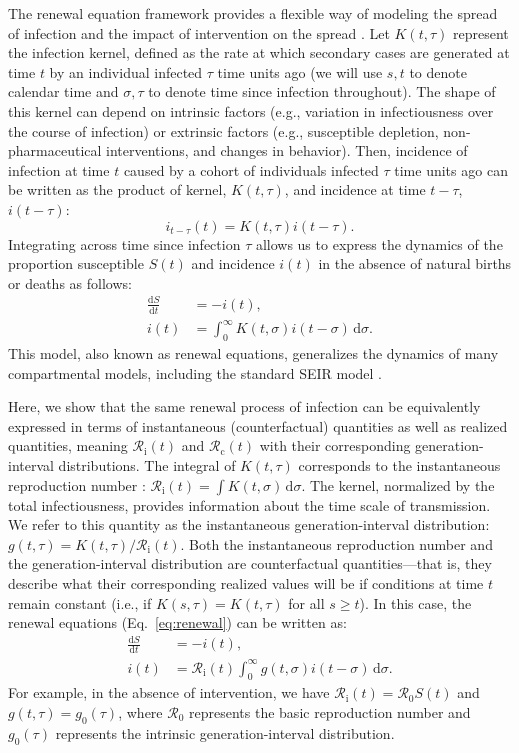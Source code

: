 \documentclass[12pt]{article}
\newcommand{\eref}[1]{Eq.~\ref{eq:#1}}
\newcommand{\Rx}[1]{\ensuremath{{\mathcal R}_{#1}}\xspace}
\newcommand{\Ro}{\Rx{0}}
\newcommand{\Rc}{\Rx{\mathrm{c}}}
\newcommand{\Ri}{\Rx{\mathrm{i}}}
\newcommand{\dd}[1]{\ensuremath{\, \mathrm{d}#1}}
\newcommand{\dsigma}{\dd{\sigma}}
\begin{document}
The renewal equation framework provides a flexible way of modeling the spread of infection and the impact of intervention on the spread \citep{fraser2007estimating}.
Let $K(t, \tau)$ represent the infection kernel, defined as the rate at which secondary cases are generated at time $t$ by an individual infected $\tau$ time units ago (we will use $s, t$ to denote calendar time and $\sigma, \tau$ to denote time since infection throughout).
The shape of this kernel can depend on intrinsic factors (e.g., variation in infectiousness over the course of infection) or extrinsic factors (e.g., susceptible depletion, non-pharmaceutical interventions, and changes in behavior).
Then, incidence of infection at time $t$ caused by a cohort of individuals infected $\tau$ time units ago can be written as the product of kernel, $K(t, \tau)$, and incidence at time $t-\tau$, $i(t-\tau)$:
\begin{equation}
i_{t-\tau}(t) = K(t, \tau) i(t-\tau).
\end{equation}
Integrating across time since infection $\tau$ allows us to express the dynamics of the proportion susceptible $S(t)$ and incidence $i(t)$ in the absence of natural births or deaths as follows: 
\begin{align}
\frac{\mathrm{d}S}{\mathrm{d}t} &= - i(t),\\
i(t) &= \int_0^\infty K(t, \sigma) i(t-\sigma) \dsigma.
\label{eq:renewal}
\end{align}
This model, also known as renewal equations, generalizes the dynamics of many compartmental models, including the standard SEIR model \citep{heesterbeek1996concept, diekmann2000mathematical, roberts2004modelling, aldis2005integral, roberts2007model, champredon2018equivalence}.

Here, we show that the same renewal process of infection can be equivalently expressed in terms of instantaneous (counterfactual) quantities as well as realized quantities, meaning $\Ri(t)$ and $\Rc(t)$ with their corresponding generation-interval distributions.
The integral of $K(t, \tau)$ corresponds to the instantaneous reproduction number \citep{fraser2007estimating}: $\Ri(t) = \int K(t, \sigma) \dsigma$.
The kernel, normalized by the total infectiousness, provides information about the time scale of transmission.
We refer to this quantity as the instantaneous generation-interval distribution: $g(t, \tau) = K(t, \tau)/\Ri(t)$.
Both the instantaneous reproduction number and the generation-interval distribution are counterfactual quantities---that is, they describe what their corresponding realized values will be if conditions at time $t$ remain constant (i.e., if $K(s, \tau) = K(t, \tau)$ for all $s \geq t$).
In this case, the renewal equations (\eref{renewal}) can be written as:
\begin{align}
\frac{\mathrm{d}S}{\mathrm{d}t} &= - i(t),\\
i(t) &= \Ri(t) \int_0^\infty g(t, \sigma) i(t-\sigma) \dsigma.
\label{eq:renewal_instantaneous}
\end{align}
For example, in the absence of intervention, we have $\Ri(t) = \Ro S(t)$ and $g(t, \tau) = g_0(\tau)$, where $\Ro$ represents the basic reproduction number and $g_0(\tau)$ represents the intrinsic generation-interval distribution.
\end{document}
